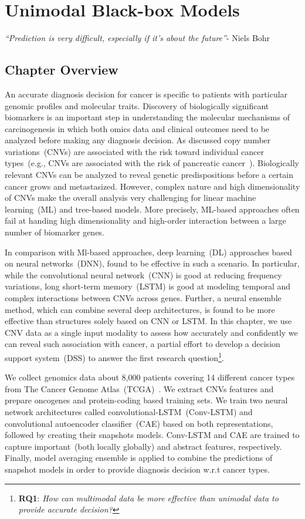 \chapter{Unimodal Black-box Models}\label{chapter:uni_modality}
\textit{``Prediction is very difficult, especially if it's about the future''}-
Niels Bohr\\

\section{Chapter Overview} 
An accurate diagnosis decision for cancer is specific to patients with particular genomic profiles and molecular traits. Discovery of biologically significant biomarkers is an important step in understanding the molecular mechanisms of carcinogenesis in which both omics data and clinical outcomes need to be analyzed before making any diagnosis decision. As discussed copy number variations~(CNVs) are associated with the risk toward individual cancer types~(e.g., CNVs are associated with the risk of pancreatic cancer~\cite{66Huang}). Biologically relevant CNVs can be analyzed to reveal genetic predispositions before a certain cancer grows and metastasized. 
However, complex nature and high dimensionality of CNVs make the overall analysis very challenging for linear machine learning~(ML) and tree-based models. More precisely, ML-based approaches often fail at handing high dimensionality and high-order interaction between a large number of biomarker genes. 

\hspace*{3.5mm} In comparison with Ml-based approaches, deep learning~(DL) approaches based on neural networks~(DNN), found to be effective in such a scenario. In particular, while the convolutional neural network~(CNN) is good at reducing frequency variations, long short-term memory~(LSTM) is good at  modeling temporal and complex interactions between CNVs across genes. Further, a neural ensemble method, which can combine several deep architectures, is found to be more effective than structures solely based on CNN or LSTM. In this chapter, we use CNV data as a single input modality to assess how accurately and confidently we can reveal such association with cancer, a partial effort to develop a decision support system~(DSS) to answer the first research question\footnote{\textbf{RQ1}: \textit{How can multimodal data be more effective than unimodal data to provide accurate decision?}}. 

\hspace*{3.5mm} We collect genomics data about 8,000 patients covering 14 different cancer types from The Cancer Genome Atlas~(TCGA)~\cite{tcga}. We extract CNVs features and prepare oncogenes and protein-coding based training sets. We train two neural network architectures called convolutional-LSTM~({Conv-LSTM}) and convolutional autoencoder classifier~({CAE}) based on both representations, followed by creating their snapshots models. {Conv-LSTM} and {CAE} are trained to capture important~(both locally globally) and abstract features, respectively. Finally, model averaging ensemble is applied to combine the predictions of snapshot models in order to provide diagnosis decision w.r.t cancer types. 


